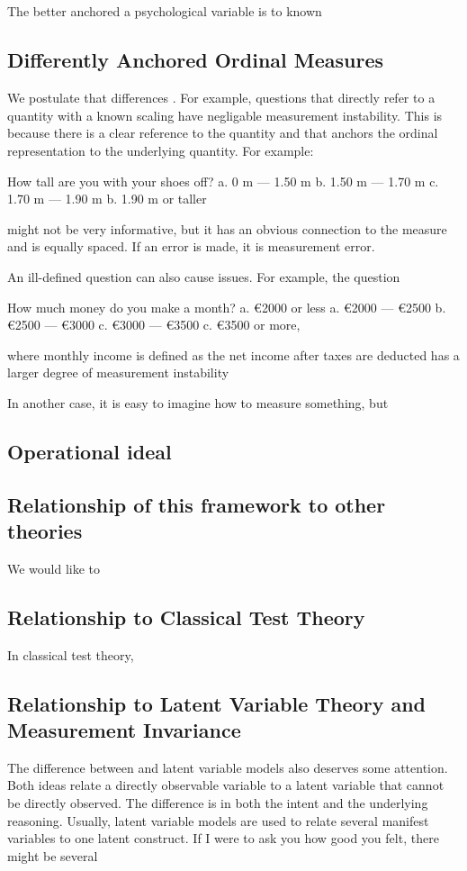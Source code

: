 \documentclass[utf8]{FrontiersinVancouver}
\begin{document}
\subsection{}
The better anchored a psychological variable is to known 

\subsection{Differently Anchored Ordinal Measures}
We postulate that differences . For example, questions that directly refer to a quantity with a known scaling have negligable measurement instability. This is because there is a clear reference to the quantity and that anchors the ordinal representation to the underlying quantity. For example:

How tall are you with your shoes off?
a. 0 m --- 1.50 m
b. 1.50 m --- 1.70 m
c. 1.70 m --- 1.90 m
b. 1.90 m or taller

might not be very informative, but it has an obvious connection to the measure and is equally spaced. If an error is made, it is measurement error.

An ill-defined question can also cause issues. For example, the question

How much money do you make a month?
a. €2000 or less
a. €2000 --- €2500
b. €2500 --- €3000
c. €3000 --- €3500
c. €3500 or more,

where monthly income is defined as the net income after taxes are deducted has a larger degree of measurement instability

In another case, it is easy to imagine how to measure something, but 

\subsection{Operational ideal}

\subsection{Relationship of this framework to other theories}
We would like to 

\subsection{Relationship to Classical Test Theory}
In classical test theory, 

\subsection{Relationship to Latent Variable Theory and Measurement Invariance}
The difference between and latent variable models also deserves some attention. Both ideas relate a directly observable variable to a latent variable that cannot be directly observed. The difference is in both the intent and the underlying reasoning. Usually, latent variable models are used to relate several manifest variables to one latent construct. If I were to ask you how good you felt, there might be several  
\end{document}
